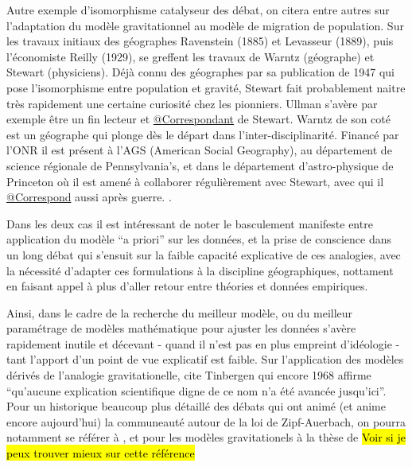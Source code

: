 Autre exemple d'isomorphisme catalyseur des débat, on citera entre autres sur l'adaptation du modèle gravitationnel au modèle de migration de population. Sur les travaux initiaux des géographes Ravenstein (1885) et Levasseur (1889), puis l'économiste Reilly (1929), se greffent les travaux de Warntz (géographe) et Stewart (physiciens). Déjà connu des géographes par sa publication de 1947 qui pose l'isomorphisme entre population et gravité, Stewart fait probablement naitre très rapidement une certaine curiosité chez les pionniers. Ullman s'avère par exemple être un fin lecteur \autocite[61]{Glick1988} et \href{http://nwda.orbiscascade.org/ark:/80444/xv01385}{@Correspondant} de Stewart. Warntz de son coté est un géographe qui plonge dès le départ dans l'inter-disciplinarité. Financé par l'ONR il est présent à l'AGS (American Social Geography), au département de science régionale de Pennsylvania's, et dans le département d'astro-physique de Princeton où il est amené à collaborer régulièrement avec Stewart, avec qui il \href{http://rmc.library.cornell.edu/EAD/htmldocs/RMM04392.html}{@Correspond} aussi après guerre. \autocite{Barnes2006}. 

Dans les deux cas il est intéressant de noter le basculement manifeste entre application du modèle \foreignquote{latin}{a priori} sur les données, et la prise de conscience dans un long débat qui s'ensuit sur la faible capacité explicative de ces analogies, avec la nécessité d'adapter ces formulations à la discipline géographiques, nottament en faisant appel à plus d'aller retour entre théories et données empiriques. 

Ainsi, dans le cadre de la recherche du meilleur modèle, ou du meilleur paramétrage de modèles mathématique pour ajuster les données s'avère rapidement inutile et décevant - quand il n'est pas en plus empreint d'idéologie - tant l'apport d'un point de vue explicatif est faible. Sur l'application des modèles dérivés de l'analogie gravitationelle, \textcite[37]{Pumain1982} cite Tinbergen qui encore 1968 affirme \enquote{qu'aucune explication scientifique digne de ce nom n'a été avancée jusqu'ici}. Pour un historique beaucoup plus détaillé des débats qui ont animé (et anime encore aujourd'hui) la communeauté autour de la loi de Zipf-Auerbach, on pourra notamment se référer à \textcite{Pumain1982}, et pour les modèles gravitationels à la thèse de \autocite{JensenButler1970} \hl{Voir si je peux trouver mieux sur cette référence}

